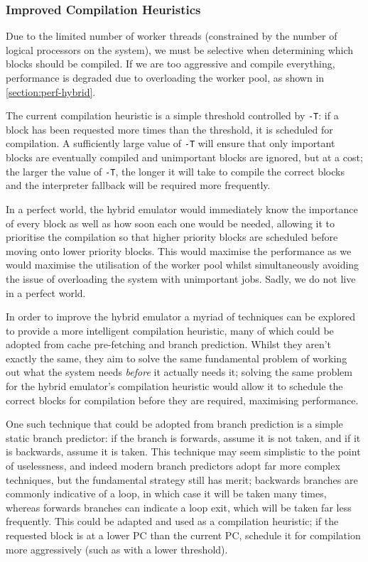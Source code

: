 \subsubsection{Improved Compilation Heuristics}
\label{section:further-hybrid}

Due to the limited number of worker threads (constrained by the number of logical processors on the system), we must be selective when determining which blocks should be compiled. If we are too aggressive and compile everything, performance is degraded due to overloading the worker pool, as shown in \autoref{section:perf-hybrid}.

The current compilation heuristic is a simple threshold controlled by \texttt{-T}: if a block has been requested more times than the threshold, it is scheduled for compilation. A sufficiently large value of \texttt{-T} will ensure that only important blocks are eventually compiled and unimportant blocks are ignored, but at a cost; the larger the value of \texttt{-T}, the longer it will take to compile the correct blocks and the interpreter fallback will be required more frequently.

In a perfect world, the hybrid emulator would immediately know the importance of every block as well as how soon each one would be needed, allowing it to prioritise the compilation so that higher priority blocks are scheduled before moving onto lower priority blocks. This would maximise the performance as we would maximise the utilisation of the worker pool whilst simultaneously avoiding the issue of overloading the system with unimportant jobs. Sadly, we do not live in a perfect world.

In order to improve the hybrid emulator a myriad of techniques can be explored to provide a more intelligent compilation heuristic, many of which could be adopted from cache pre-fetching and branch prediction. Whilst they aren't exactly the same, they aim to solve the same fundamental problem of working out what the system needs \textit{before} it actually needs it; solving the same problem for the hybrid emulator's compilation heuristic would allow it to schedule the correct blocks for compilation before they are required, maximising performance.

One such technique that could be adopted from branch prediction is a simple static branch predictor: if the branch is forwards, assume it is not taken, and if it is backwards, assume it is taken. This technique may seem simplistic to the point of uselessness, and indeed modern branch predictors adopt far more complex techniques, but the fundamental strategy still has merit; backwards branches are commonly indicative of a loop, in which case it will be taken many times, whereas forwards branches can indicate a loop exit, which will be taken far less frequently. This could be adapted and used as a compilation heuristic; if the requested block is at a lower PC than the current PC, schedule it for compilation more aggressively (such as with a lower threshold).